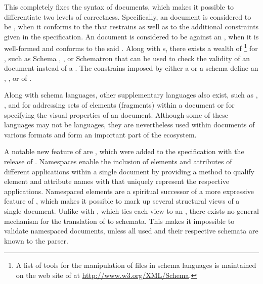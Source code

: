 \documentclass{book}
\begin{document}
This  completely fixes the syntax of  documents, which
makes it possible to differentiate two levels of correctness. Specifically, an
 document is considered to be %
, when it conforms to the 
 that restrains  as well as to the additional
constraints given in the specification. An  document is
considered to be   against an
 , when it is well-formed and conforms to the said
 .  Along with s, there exists a wealth
of \footnote{
  A list of tools for the manipulation of files in  schema
  languages is maintained on the web site of  at
  \url{http://www.w3.org/XML/Schema}.
} for , such as   Schema
, , or Schematron that can be used to
check the validity of an  document instead of a .
The constrains imposed by either a  or a schema define an
, , or 
 
 of .

Along with schema languages, other supplementary languages also exist, such as
, , and  for addressing sets of elements
(fragments) within a  document or  for specifying the
visual properties of an  document. Although some of these
languages may not be  languages, they are nevertheless used within
documents of various  formats and form an important part of the
ecosystem.

A notable new feature of  are %
, which were added to the specification with the
release of \cite{bray99}. Namespaces enable the inclusion of elements and
attributes of different  applications within a single 
document by providing a method to qualify element and attribute names with
 that uniquely represent the respective  applications.
Namespaced elements are a spiritual successor of a more expressive
 feature of , which makes it possible to
mark up several structural views of a single document. Unlike with
, which ties each view to an  ,
there exists no general mechanism for the translation of  to
 schemata.  This makes it impossible to validate namespaced
 documents, unless all used  and their respective
schemata are known to the parser.
\end{document}
